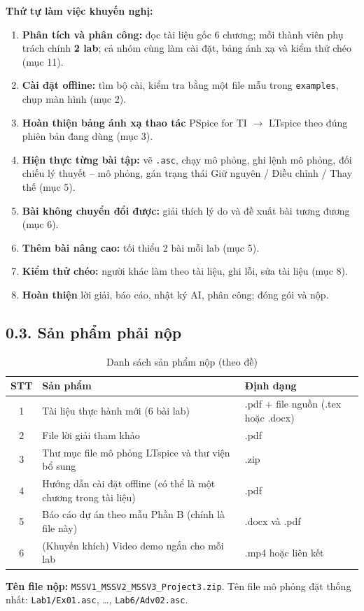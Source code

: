 \documentclass[12pt,a4paper]{article}
\newcommand{\hc}[1]{\cellcolor{navy}\color{white}\sffamily\bfseries\small #1}
\begin{document}
\textbf{Thứ tự làm việc khuyến nghị:}
\begin{enumerate}
  \item \textbf{Phân tích và phân công:} đọc tài liệu gốc 6 chương; mỗi thành viên phụ trách chính \textbf{2 lab}; cả nhóm cùng làm cài đặt, bảng ánh xạ và kiểm thử chéo (mục 11).
  \item \textbf{Cài đặt offline:} tìm bộ cài, kiểm tra bằng một file mẫu trong \texttt{examples}, chụp màn hình (mục 2).
  \item \textbf{Hoàn thiện bảng ánh xạ thao tác} PSpice for TI $\rightarrow$ LTspice theo đúng phiên bản đang dùng (mục 3).
  \item \textbf{Hiện thực từng bài tập:} vẽ \texttt{.asc}, chạy mô phỏng, ghi lệnh mô phỏng, đối chiếu lý thuyết -- mô phỏng, gán trạng thái Giữ nguyên / Điều chỉnh / Thay thế (mục 5).
  \item \textbf{Bài không chuyển đổi được:} giải thích lý do và đề xuất bài tương đương (mục 6).
  \item \textbf{Thêm bài nâng cao:} tối thiểu 2 bài mỗi lab (mục 5).
  \item \textbf{Kiểm thử chéo:} người khác làm theo tài liệu, ghi lỗi, sửa tài liệu (mục 8).
  \item \textbf{Hoàn thiện} lời giải, báo cáo, nhật ký AI, phân công; đóng gói và nộp.
\end{enumerate}

\subsection*{0.3. Sản phẩm phải nộp}
\begin{table}[H]\centering\small
\caption{Danh sách sản phẩm nộp (theo đề)}
\renewcommand{\arraystretch}{1.25}
\begin{tabular}{|c|p{8.2cm}|p{4.2cm}|}
\hline
\hc{STT} & \hc{Sản phẩm} & \hc{Định dạng}\\ \hline
1 & Tài liệu thực hành mới (6 bài lab) & .pdf + file nguồn (.tex hoặc .docx)\\ \hline
2 & File lời giải tham khảo & .pdf\\ \hline
3 & Thư mục file mô phỏng LTspice và thư viện bổ sung & .zip\\ \hline
4 & Hướng dẫn cài đặt offline (có thể là một chương trong tài liệu) & .pdf\\ \hline
5 & Báo cáo dự án theo mẫu Phần B (chính là file này) & .docx và .pdf\\ \hline
6 & (Khuyến khích) Video demo ngắn cho mỗi lab & .mp4 hoặc liên kết\\ \hline
\end{tabular}
\end{table}
\textbf{Tên file nộp:} \texttt{MSSV1\_MSSV2\_MSSV3\_Project3.zip}. Tên file mô phỏng đặt thống nhất: \texttt{Lab1/Ex01.asc}, \dots, \texttt{Lab6/Adv02.asc}.
\end{document}
